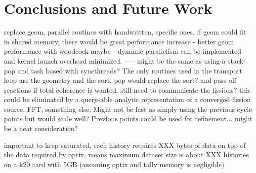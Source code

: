 \chapter{Conclusions and Future Work}
\label{chap:conclusions}

replace geom, parallel routines with handwritten, specific ones, if geom could fit in shared memory, there would be great performance increase
- better geom performance with woodcock maybe
- dynamic parallelism can be implemented and kernel launch overhead minimized.  
-----  might be the same as using a stack-pop and task based with syncthreads?  The only routines used in the transport loop are the geometry and the sort.   pop would replace the sort?  and pass off reactions if total coherence is wanted.  still need to communicate the fissions?  this could be eliminated by a query-able analytic representation of a converged fission source.  FFT, something else.  Might not be fast as simply using the previous cycle points but would scale well?  Previous points could be used for refinement...  might be a neat consideration?

important to keep saturated, each history requires XXX bytes of data on top of the data required by optix, means maximum dataset size is about XXX histories on a k20 card with 5GB (assuming optix and tally memory is negligible)